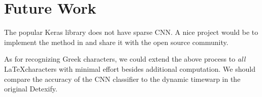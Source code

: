 \documentclass[12pt,letterpaper,boxed]{article}
\begin{document}
\section{Future Work}
The popular Keras library does not have sparse CNN. A nice project would be to implement the method in \cite{bao2015} and share it with the open source community.

As for recognizing Greek characters, we could extend the above process to \textit{all} \LaTeX characters with minimal effort besides additional computation. We should compare the accuracy of the CNN classifier to the dynamic timewarp in the original Detexify.



\end{document}
